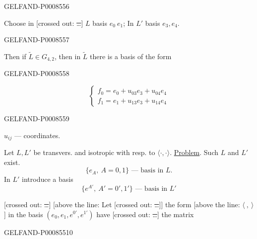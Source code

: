 \begin{GelfandAdjacentEvidence}{GELFAND-P000855}{6}


Choose in [crossed out: \sout{…}] \(L\) basis \(e_0\ e_1\); In \(L'\) basis \(e_3,e_4\).
\end{GelfandAdjacentEvidence}
\begin{GelfandAdjacentEvidence}{GELFAND-P000855}{7}

Then if \(\widetilde L\in G_{4,2}\), then in \(\widetilde L\) there is a basis of the form
\end{GelfandAdjacentEvidence}
\begin{GelfandAdjacentEvidence}{GELFAND-P000855}{8}

\[
\begin{cases}
f_0=e_0+u_{03}e_3+u_{04}e_4\\
f_1=e_1+u_{13}e_3+u_{14}e_4
\end{cases}\tag{3}
\]
\end{GelfandAdjacentEvidence}
\begin{GelfandAdjacentEvidence}{GELFAND-P000855}{9}

\(u_{ij}\) — coordinates.

Let \(L,L'\) be transvers. and isotropic with resp. to \(\langle\cdot,\cdot\rangle\).
\uline{Problem}. Such \(L\) and \(L'\) exist.
\[
\{e_A,\ A=0,1\}\text{ — basis in } L.\tag{4}
\]
In \(L'\) introduce a basis
\[
\{e^{A'},\ A'=0',1'\}\text{ — basis in } L'\tag{5}
\]

[crossed out: \sout{…}] [above the line: Let [crossed out: \sout{…}]]
the form [above the line: \(\langle\ ,\ \rangle\)] in the basis
\((e_0,e_1,e^{0'},e^{1'})\) have [crossed out: \sout{…}] the matrix
\end{GelfandAdjacentEvidence}
\begin{GelfandAdjacentEvidence}{GELFAND-P000855}{10}

\end{GelfandAdjacentEvidence}
